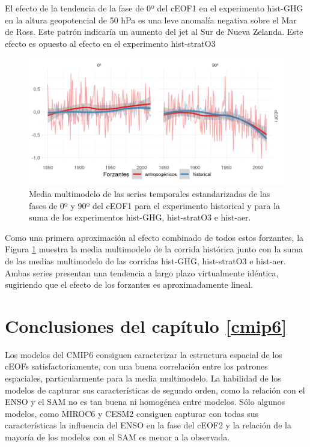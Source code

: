 \documentclass[12pt,oneside,a4paper]{reedthesis}
\begin{document}
El efecto de la tendencia de la fase de 0º del cEOF1 en el experimento hist-GHG en la altura geopotencial de 50 hPa es una leve anomalía negativa sobre el Mar de Ross.
Este patrón indicaría un aumento del jet al Sur de Nueva Zelanda.
Este efecto es opuesto al efecto en el experimento hist-stratO3



\begin{figure}

{\centering \includegraphics{figures/50-cmip6/suma-1} 

}

\caption{Media multimodelo de las series temporales estandarizadas de las fases de 0º y 90º del cEOF1 para el experimento historical y para la suma de los experimentos hist-GHG, hist-stratO3 e hist-aer.}\label{fig:suma}
\end{figure}

Como una primera aproximación al efecto combinado de todos estos forzantes, la Figura \ref{fig:suma} muestra la media multimodelo de la corrida histórica junto con la suma de las medias multimodelo de las corridas hist-GHG, hist-stratO3 e hist-aer.
Ambas series presentan una tendencia a largo plazo virtualmente idéntica, sugiriendo que el efecto de los forzantes es aproximadamente lineal.

\hypertarget{conclusiones-del-capuxedtulo-refcmip6}{%
\section{Conclusiones del capítulo \ref{cmip6}}\label{conclusiones-del-capuxedtulo-refcmip6}}

Los modelos del CMIP6 consiguen caracterizar la estructura espacial de los cEOFs satisfactoriamente, con una buena correlación entre los patrones espaciales, particularmente para la media multimodelo.
La habilidad de los modelos de capturar sus características de segundo orden, como la relación con el ENSO y el SAM no es tan buena ni homogénea entre modelos.
Sólo algunos modelos, como MIROC6 y CESM2 consiguen capturar con todas sus características la influencia del ENSO en la fase del cEOF2 y la relación de la mayoría de los modelos con el SAM es menor a la observada.
\end{document}
